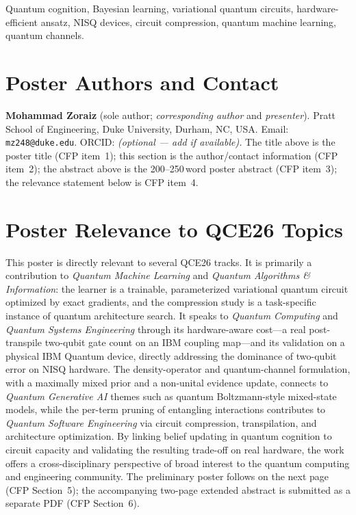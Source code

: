 \documentclass[10pt,conference]{IEEEtran}
\begin{document}
\begin{IEEEkeywords}
Quantum cognition, Bayesian learning, variational quantum circuits, hardware-efficient ansatz,
NISQ devices, circuit compression, quantum machine learning, quantum channels.
\end{IEEEkeywords}

\section{Poster Authors and Contact}
\textbf{Mohammad Zoraiz} (sole author; \emph{corresponding author} and \emph{presenter}).
Pratt School of Engineering, Duke University, Durham, NC, USA. Email:
\texttt{mz248@duke.edu}. ORCID: \emph{(optional --- add if available).} The title above is the
poster title (CFP item~1); this section is the author/contact information (CFP item~2); the
abstract above is the 200--250\,word poster abstract (CFP item~3); the relevance statement
below is CFP item~4.

\section{Poster Relevance to QCE26 Topics}
This poster is directly relevant to several QCE26 tracks. It is primarily a contribution to
\emph{Quantum Machine Learning} and \emph{Quantum Algorithms \& Information}: the learner is a
trainable, parameterized variational quantum circuit optimized by exact gradients, and the
compression study is a task-specific instance of quantum architecture search. It speaks to
\emph{Quantum Computing} and \emph{Quantum Systems Engineering} through its hardware-aware
cost---a real post-transpile two-qubit gate count on an IBM coupling map---and its validation
on a physical IBM Quantum device, directly addressing the dominance of two-qubit error on NISQ
hardware. The density-operator and quantum-channel formulation, with a maximally mixed prior
and a non-unital evidence update, connects to \emph{Quantum Generative AI} themes such as
quantum Boltzmann-style mixed-state models, while the per-term pruning of entangling
interactions contributes to \emph{Quantum Software Engineering} via circuit compression,
transpilation, and architecture optimization. By linking belief updating in quantum cognition
to circuit capacity and validating the resulting trade-off on real hardware, the work offers a
cross-disciplinary perspective of broad interest to the quantum computing and engineering
community. The preliminary poster follows on the next page (CFP Section~5); the accompanying
two-page extended abstract is submitted as a separate PDF (CFP Section~6).
\end{document}
